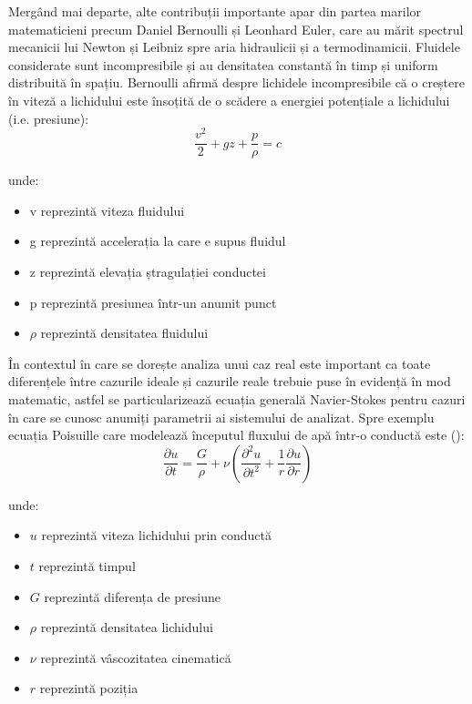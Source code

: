 Mergând mai departe, alte contribuții importante apar din partea marilor matematicieni precum Daniel Bernoulli și Leonhard Euler, care au mărit spectrul mecanicii lui Newton și Leibniz spre aria hidraulicii și a termodinamicii. Fluidele considerate sunt incompresibile și au densitatea constantă în timp și uniform distribuită în spațiu. Bernoulli afirmă despre lichidele incompresibile că o creștere în viteză a lichidului este însoțită de o scădere a energiei potențiale a lichidului (i.e. presiune):
\begin{equation}
\frac{v^2}{2} + gz + \frac{p}{\rho} = c
\end{equation}

unde:
\begin{itemize}
\item v reprezintă viteza fluidului
\item g reprezintă accelerația la care e supus fluidul
\item z reprezintă elevația ștragulației conductei
\item p reprezintă presiunea într-un anumit punct
\item $\rho$ reprezintă densitatea fluidului
\end{itemize}

În contextul în care se dorește analiza unui caz real este important ca toate diferențele între cazurile ideale și cazurile reale trebuie puse în evidență în mod matematic, astfel se particularizează ecuația generală Navier-Stokes pentru cazuri în care se cunosc anumiți parametrii ai sistemului de analizat. Spre exemplu ecuația Poisuille care modelează începutul fluxului de apă într-o conductă este (\cite{elger2016engineering}):
\begin{equation}
\frac{\partial u}{\partial t} = \frac{G}{\rho} + \nu ( \frac{\partial^2 u}{\partial t^2} + \frac{1}{r}\frac{\partial u}{\partial{r}})
\end{equation}

unde:
\begin{itemize}
\item $u$ reprezintă viteza lichidului prin conductă
\item $t$ reprezintă timpul
\item $G$ reprezintă diferența de presiune
\item $\rho$ reprezintă densitatea lichidului
\item $\nu$ reprezintă vâscozitatea cinematică
\item $r$ reprezintă poziția
\end{itemize}

